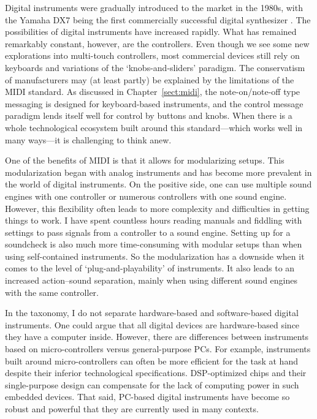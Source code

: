 Digital instruments were gradually introduced to the market in the 1980s, with the Yamaha DX7 being the first commercially successful digital synthesizer \citep{shepard_refining_2013}. The possibilities of digital instruments have increased rapidly. What has remained remarkably constant, however, are the controllers. Even though we see some new explorations into multi-touch controllers, most commercial devices still rely on keyboards and variations of the `knobs-and-sliders' paradigm. The conservatism of manufacturers may (at least partly) be explained by the limitations of the MIDI standard. As discussed in Chapter~\ref{sect:midi}, the note-on/note-off type messaging is designed for keyboard-based instruments, and the control message paradigm lends itself well for control by buttons and knobs. When there is a whole technological ecosystem built around this standard---which works well in many ways---it is challenging to think anew.

One of the benefits of MIDI is that it allows for modularizing setups. This modularization began with analog instruments and has become more prevalent in the world of digital instruments. On the positive side, one can use multiple sound engines with one controller or numerous controllers with one sound engine. However, this flexibility often leads to more complexity and difficulties in getting things to work. I have spent countless hours reading manuals and fiddling with settings to pass signals from a controller to a sound engine. Setting up for a soundcheck is also much more time-consuming with modular setups than when using self-contained instruments. So the modularization has a downside when it comes to the level of `plug-and-playability' of instruments. It also leads to an increased action--sound separation, mainly when using different sound engines with the same controller.

In the taxonomy, I do not separate hardware-based and software-based digital instruments. One could argue that all digital devices are hardware-based since they have a computer inside. However, there are differences between instruments based on micro-controllers versus general-purpose PCs. For example, instruments built around micro-controllers can often be more efficient for the task at hand despite their inferior technological specifications. DSP-optimized chips and their single-purpose design can compensate for the lack of computing power in such embedded devices. That said, PC-based digital instruments have become so robust and powerful that they are currently used in many contexts.

